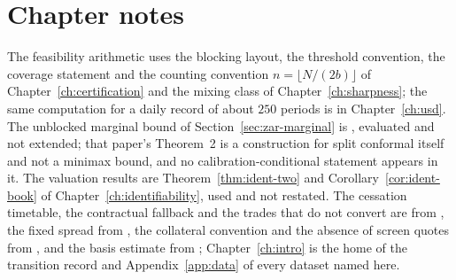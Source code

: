 \documentclass[../../../main.tex]{subfiles}
\begin{document}
\section*{Chapter notes}

The feasibility arithmetic uses the blocking layout, the threshold convention, the coverage statement and the counting convention $n=\lfloor N/(2b)\rfloor$ of Chapter~\ref{ch:certification} and the mixing class of Chapter~\ref{ch:sharpness}; the same computation for a daily record of about $250$ periods is in Chapter~\ref{ch:usd}. The unblocked marginal bound of Section~\ref{sec:zar-marginal} is \citet[Cor.~1, eq.~(6)]{barber2026}, evaluated and not extended; that paper's Theorem~2 is a construction for split conformal itself and not a minimax bound, and no calibration-conditional statement appears in it. The valuation results are Theorem~\ref{thm:ident-two} and Corollary~\ref{cor:ident-book} of Chapter~\ref{ch:identifiability}, used and not restated. The cessation timetable, the contractual fallback and the trades that do not convert are from \citet[p.~1, Sects.~1.1, 3, 5, 8]{isda2025}, the fixed spread from \citet[p.~1]{bisl2025}, the collateral convention and the absence of screen quotes from \citet[\S3, p.~5 and \S8.2, p.~27]{sarb2024conv}, and the basis estimate from \citet[Sec.~5.1, Table~4]{alfeus2026}; Chapter~\ref{ch:intro} is the home of the transition record and Appendix~\ref{app:data} of every dataset named here.
\end{document}
